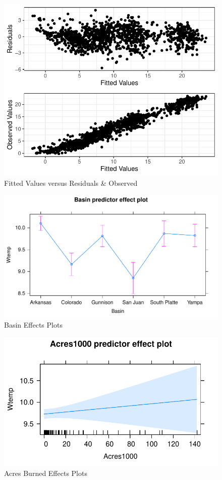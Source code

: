 \documentclass[
]{article}
\begin{document}
\begin{figure}
\centering
\includegraphics{D2P-Report_files/figure-latex/fig14-1.pdf}
\caption{\label{fig:figs14}Fitted Values versus Residuals \& Observed}
\end{figure}

\begin{figure}
\centering
\includegraphics{D2P-Report_files/figure-latex/fig15-1.pdf}
\caption{\label{fig:figs15}Basin Effects Plots}
\end{figure}

\begin{figure}
\centering
\includegraphics{D2P-Report_files/figure-latex/fig16-1.pdf}
\caption{\label{fig:figs16}Acres Burned Effects Plots}
\end{figure}
\end{document}
